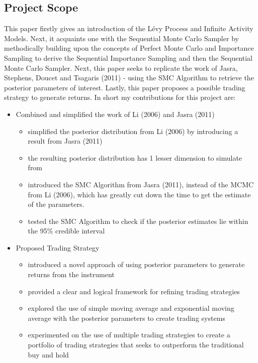 \documentclass[12pt]{article}
\theoremstyle{definition}
\begin{document}
\subsection{Project Scope}
This paper firstly gives an introduction of the L\'{e}vy Process and Infinite Activity Models. Next, it acquaints one with the Sequential Monte Carlo Sampler by methodically building upon the concepts of Perfect Monte Carlo and Importance Sampling to derive the Sequential Importance Sampling and then the Sequential Monte Carlo Sampler. Next, this paper seeks to replicate the work of Jasra, Stephens, Doucet and Tsagaris (2011) - using the SMC Algorithm to retrieve the posterior parameters of interest. Lastly, this paper proposes a possible trading strategy to generate returns. In short my contributions for this project are:
\begin{itemize}
\item Combined and simplified the work of Li (2006) and Jasra (2011)
\begin{itemize}
\item simplified the posterior distribution from Li (2006) by introducing a result from Jasra (2011)
\item the resulting posterior distribution has 1 lesser dimension to simulate from
\item introduced the SMC Algorithm from Jasra (2011), instead of the MCMC from Li (2006), which has greatly cut down the time to get the estimate of the parameters.
\item tested the SMC Algorithm to check if the posterior estimates lie within the 95\% credible interval
\end{itemize}
\item Proposed Trading Strategy
\begin{itemize}
\item introduced a novel approach of using posterior parameters to generate returns from the instrument
\item provided a clear and logical framework for refining trading strategies
\item explored the use of simple moving average and exponential moving average with the posterior parameters to create trading systems
\item experimented on the use of multiple trading strategies to create a portfolio of trading strategies that seeks to outperform the traditional buy and hold
\end{itemize}
\end{itemize}
\newpage
\end{document}
